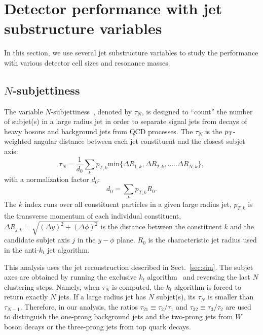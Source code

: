 \section{Detector performance with jet substructure variables}
In this section, we use several jet substructure variables to study the performance with various detector cell sizes and resonance masses.

\subsection{$N$-subjettiness \label{sec:nsub}}
The variable $N$-subjettiness~\cite{Thaler:2010tr}, denoted by $\tau_N$, is designed to 
``count'' the number of subjet(s) in a large radius jet in order to separate 
signal jets from decays of heavy bosons and background jets from QCD processes. 
The $\tau_N$ is the $p_{\mathrm{T}}$-weighted angular distance between each jet 
constituent and the closest subjet axis: 
\begin{equation}\label{eq:Nsub_1}
\tau_{N}=\frac{1}{d_{0}}\sum_{k}p_{T,k} \mathrm{min}\{\Delta R_{1,k},\Delta R_{2,k},.....\Delta R_{N,k}\},
\end{equation}
with a normalization factor $d_0$: \[d_{0}=\sum_{k}p_{T,k} R_{0}.\] 
The $k$ index runs over all constituent particles in a given large radius jet, 
$p_{T,k}$ is the transverse momentum of each individual constituent, 
$\Delta R_{j,k}=\sqrt{(\Delta y)^{2}+(\Delta \phi)^{2}}$ is the distance 
between the constituent $k$ and the candidate subjet axis $j$ in the 
$y-\phi$ plane. $R_{0}$ is the characteristic jet radius used in 
the anti-$k_t$ jet algorithm. 

This analysis uses the jet reconstruction described in Sect.~\ref{sec:sim}. 
The subjet axes are obtained by running the 
exclusive $k_{t}$ algorithm~\cite{Catani:246812} and reversing the last $N$ clustering steps. 
Namely, when $\tau_N$ is computed, the $k_{t}$ algorithm is forced to return 
exactly $N$ jets. If a large radius jet has $N$ subjet(s), its $\tau_{N}$ is 
smaller than $\tau_{N-1}$. Therefore, in our analysis, 
the ratios $\tau_{21} \equiv \tau_{2}/\tau_{1}$ and $\tau_{32} \equiv \tau_{3}/\tau_{2}$ 
are used to distinguish the one-prong background jets and 
the two-prong jets from $W$ boson decays or the three-prong jets from top quark decays. 

